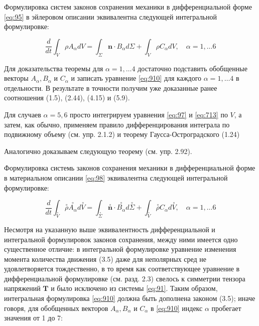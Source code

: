 \begin{theorem} Формулировка систем законов сохранения механики в дифференциальной форме \eqref{eq:95} в эйлеровом описании эквивалентна следующей интегральной формулировке:

\begin{equation}
\frac{d}{d t} \int_{V} \rho A_{\alpha} d V=\int_{\Sigma} \mathbf{n} \cdot B_{\alpha} d \Sigma+\int_{V} \rho C_{\alpha} d V, \quad \alpha=1, \ldots 6 \label{eq:910}
\end{equation}
\end{theorem}

Для доказательства теоремы для $\alpha=1, \ldots 4$ достаточно подставить обобщенные векторы $A_{\alpha}, B_{\alpha}$ и $C_{\alpha}$ и записать уравнение \eqref{eq:910} для каждого $\alpha=1, \ldots 4$ в отдельности. В результате в точности получим уже доказанные ранее соотношения (1.5), (2.44), (4.15) и (5.9).

Для случаев $\alpha=5,6$ просто интегрируем уравнения \eqref{eq:97} и \eqref{eq:713} по $V$, а затем, как обычно, применяем правило дифференцирования интеграла по подвижному объему (см. упр. 2.1.2) и теорему Гаусса-Остроградского (1.24)

Аналогично доказываем следующую теорему (см. упр. 2.92).

\begin{theorem}
 Формулировка системь законов сохранения механики в дифференциальной форме в материальном описании \eqref{eq:98} эквивалентна следующей интегральной формулировке:


\begin{equation}
\frac{d}{d t} \int_{\stackrel{\circ}{V}} \stackrel{\circ}{\rho} \stackrel{\circ}{A_{\alpha}} d \stackrel{\circ}{V}=\int_{\stackrel{\circ}{\Sigma}} \stackrel{\circ}{\mathbf{n}} \cdot \stackrel{\circ}{B_{\alpha}} d \stackrel{\circ}{\Sigma}+\int_{\stackrel{\circ}{V}} \stackrel{\circ}{\rho} C_{\alpha} d \stackrel{\circ}{V}, \quad \alpha=1, \ldots 6 \label{eq:911}
\end{equation}
\end{theorem}


Несмотря на указанную выше эквивалентность дифференциальной и интегральной формулировок законов сохранения, между ними имеется одно существенное отличие: в интегральной формулировке уравнение изменения момента количества движения (3.5) даже для неполярных сред не удовлетворяется тождественно, в то время как соответствующее уравнение в дифференциальной формулировке (см. разд. 2.3) свелось к симметрии тензора напряжений $\mathbf{T}$ и было исключено из системы \eqref{eq:91}. Таким образом, интегральная формулировка \eqref{eq:910} должна быть дополнена законом (3.5); иначе говоря, для обобщенных векторов $A_{\alpha}, B_{\alpha}$ и $C_{\alpha}$ в \eqref{eq:910} индекс $\alpha$ пробегает значения от 1 до 7:

